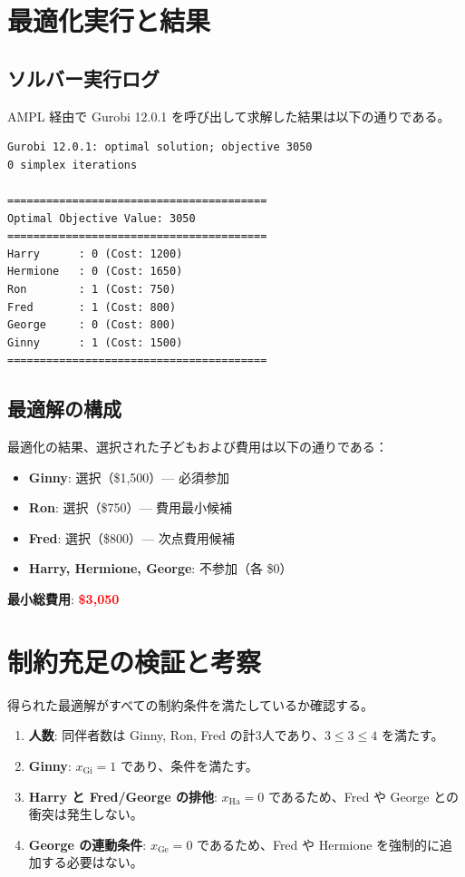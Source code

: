 \documentclass[11pt,a4paper]{ltjsarticle}
\providecommand{\alert}[1]{\textbf{\textcolor{red}{#1}}}
\begin{document}
\section{最適化実行と結果}

\subsection{ソルバー実行ログ}
AMPL 経由で Gurobi 12.0.1 を呼び出して求解した結果は以下の通りである。
\begin{lstlisting}
Gurobi 12.0.1: optimal solution; objective 3050
0 simplex iterations

========================================
Optimal Objective Value: 3050
========================================
Harry      : 0 (Cost: 1200)
Hermione   : 0 (Cost: 1650)
Ron        : 1 (Cost: 750)
Fred       : 1 (Cost: 800)
George     : 0 (Cost: 800)
Ginny      : 1 (Cost: 1500)
========================================
\end{lstlisting}

\subsection{最適解の構成}
最適化の結果、選択された子どもおよび費用は以下の通りである：
\begin{itemize}
  \item \textbf{Ginny}: 選択（\$1,500）--- 必須参加
  \item \textbf{Ron}: 選択（\$750）--- 費用最小候補
  \item \textbf{Fred}: 選択（\$800）--- 次点費用候補
  \item \textbf{Harry, Hermione, George}: 不参加（各 \$0）
\end{itemize}
\textbf{最小総費用}: \alert{\textbf{\$3,050}}

\section{制約充足の検証と考察}

得られた最適解がすべての制約条件を満たしているか確認する。
\begin{enumerate}
  \item \textbf{人数}: 同伴者数は Ginny, Ron, Fred の計3人であり、$3 \le 3 \le 4$ を満たす。
  \item \textbf{Ginny}: $x_{\text{Gi}} = 1$ であり、条件を満たす。
  \item \textbf{Harry と Fred/George の排他}: $x_{\text{Ha}} = 0$ であるため、Fred や George との衝突は発生しない。
  \item \textbf{George の連動条件}: $x_{\text{Ge}} = 0$ であるため、Fred や Hermione を強制的に追加する必要はない。
\end{enumerate}
\end{document}
